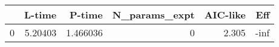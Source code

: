 \begin{tabular}{lrrrrr}
\toprule
{} &   L-time &    P-time &  N\_params\_expt &  AIC-like &  Eff \\
\midrule
0 &  5.20403 &  1.466036 &              0 &     2.305 & -inf \\
\bottomrule
\end{tabular}
